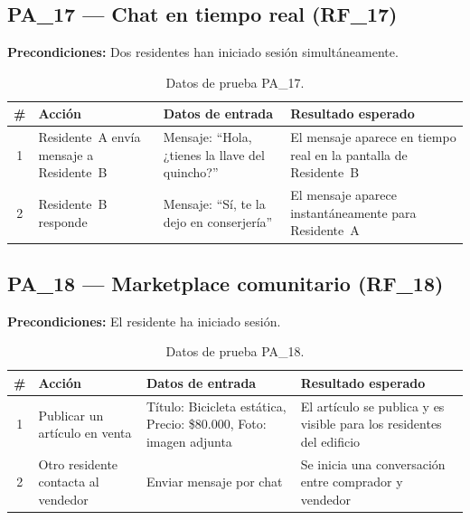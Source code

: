 \subsection{PA\_17 — Chat en tiempo real (RF\_17)}

\textbf{Precondiciones:} Dos residentes han iniciado sesión simultáneamente.

\begin{table}[H]
\centering
\small
\begin{tabular}{|c|p{}|p{}|p{}|}
\hline
\textbf{\#} & \textbf{Acción} & \textbf{Datos de entrada} & \textbf{Resultado esperado} \\ \hline
1 & Residente~A envía mensaje a Residente~B & Mensaje: ``Hola, ¿tienes la llave del quincho?'' & El mensaje aparece en tiempo real en la pantalla de Residente~B \\ \hline
2 & Residente~B responde & Mensaje: ``Sí, te la dejo en conserjería'' & El mensaje aparece instantáneamente para Residente~A \\ \hline
\end{tabular}
\caption{Datos de prueba PA\_17.}
\end{table}

\subsection{PA\_18 — Marketplace comunitario (RF\_18)}

\textbf{Precondiciones:} El residente ha iniciado sesión.

\begin{table}[H]
\centering
\small
\begin{tabular}{|c|p{}|p{}|p{}|}
\hline
\textbf{\#} & \textbf{Acción} & \textbf{Datos de entrada} & \textbf{Resultado esperado} \\ \hline
1 & Publicar un artículo en venta & Título: Bicicleta estática, Precio: \$80.000, Foto: imagen adjunta & El artículo se publica y es visible para los residentes del edificio \\ \hline
2 & Otro residente contacta al vendedor & Enviar mensaje por chat & Se inicia una conversación entre comprador y vendedor \\ \hline
\end{tabular}
\caption{Datos de prueba PA\_18.}
\end{table}


